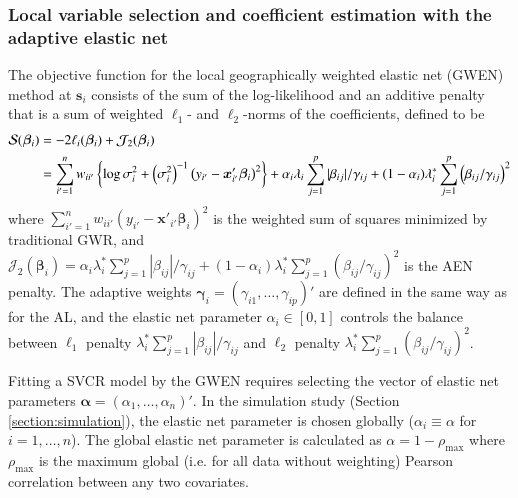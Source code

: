 \documentclass[authoryear, review, 11pt]{elsarticle}
\begin{document}
	\subsubsection{Local variable selection and coefficient estimation with the adaptive elastic net}
	The objective function for the local geographically weighted elastic net (GWEN) method at $\bm{s}_i$ consists of the sum of the log-likelihood and an additive penalty that is a sum of weighted $\ell_1$- and $\ell_2$-norms of the coefficients, defined to be
	\begin{align}
		\mathcal{S}(\bm{\beta}_i) &= -2 \ell_i(\bm{\beta}_i) + \mathcal{J}_2(\bm{\beta}_i) \notag \\
		&= \sum_{i'=1}^n w_{ii'}  \left\{ \log{\sigma^2_i}  + \left(\sigma^2_i\right)^{-1}  \left(y_{i'} - \bm{x}'_{i'} \bm{\beta}_i \right)^2 \right\} + \alpha_i \lambda_i \sum_{j=1}^p |\beta_{ij}| / \gamma_{ij} + (1-\alpha_i) \lambda^*_i \sum_{j=1}^p  \left( \beta_{ij} / \gamma_{ij} \right)^2
	\end{align}	
	where $\sum_{i'=1}^n w_{ii'} \left(y_{i'} - \bm{x}'_{i'} \bm{\beta}_i \right)^2$ is the weighted sum of squares minimized by traditional GWR, and $\mathcal{J}_2(\bm{\beta}_i) = \alpha_i \lambda^*_i \sum_{j=1}^p |\beta_{ij}| / \gamma_{ij} + (1-\alpha_i) \lambda^*_i \sum_{j=1}^p  \left( \beta_{ij} / \gamma_{ij} \right)^2$ is the AEN penalty. The adaptive weights $\bm{\gamma}_i = \left(\gamma_{i1}, \dots, \gamma_{ip}\right)'$ are defined in the same way as for the AL, and the elastic net parameter $\alpha_i \in [0,1]$ controls the balance between $\ell_1$ penalty $\lambda^*_i\sum \limits_{j=1}^p |\beta_{ij}| / \gamma_{ij}$ and $\ell_2$ penalty $\lambda^*_i \sum_{j=1}^p  \left( \beta_{ij} / \gamma_{ij} \right)^2$.
	
	Fitting a SVCR model by the GWEN requires selecting the vector of elastic net parameters $\bm{\alpha} = \left( \alpha_1, \dots, \alpha_n \right)'$. In the simulation study (Section \ref{section:simulation}), the elastic net parameter is chosen globally ($\alpha_i \equiv \alpha$ for $i=1, \dots, n$). The global elastic net parameter is calculated as $\alpha = 1-\rho_{\text{max}}$ where $\rho_{\text{max}}$ is the maximum global (i.e. for all data without weighting) Pearson correlation between any two covariates.
\end{document}
